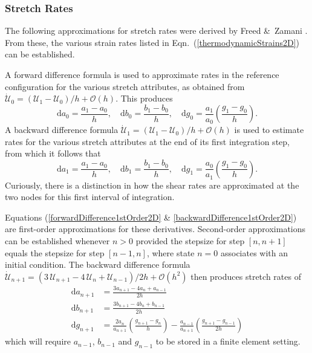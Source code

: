 \subsubsection{Stretch Rates}

The following approximations for stretch rates were derived by Freed \&\ Zamani \cite{FreedZamani18}.  From these, the various strain rates listed in Eqn.~(\ref{thermodynamicStrains2D}) can be established.  

A forward difference formula is used to approximate rates in the reference configuration for the various stretch attributes, as obtained from $\dot{\boldsymbol{\mathcal{U}}}_0 = ( \boldsymbol{\mathcal{U}}_1 -  \boldsymbol{\mathcal{U}}_0 ) / h + \mathcal{O}(h)$.  This produces
\begin{equation}
\mathrm{d} a_0 = \frac {a_1 - a_0}{h} , \quad 
\mathrm{d} b_0 = \frac {b_1 - b_0}{h} , \quad 
\mathrm{d} g_0 = \frac{a_1}{a_0} 
\left( \frac{g_1 - g_0}{h} \right) .
\label{forwardDifference1stOrder2D}
\end{equation}
A backward difference formula $\dot{\boldsymbol{\mathcal{U}}}_1 = ( \boldsymbol{\mathcal{U}}_1 - \boldsymbol{\mathcal{U}}_0 ) / h + \mathcal{O}(h)$ is used to estimate rates for the various stretch attributes at the end of its first integration step, from which it follows that
\begin{equation}
\mathrm{d} a_1 = \frac {a_1 - a_0}{h} , \quad
\mathrm{d} b_1 = \frac {b_1 - b_0}{h} , \quad
\mathrm{d} g_1 = \frac{a_0}{a_1} 
\left(\frac{g_1 - g_0}{h} \right) .
\label{backwardDifference1stOrder2D}
\end{equation}
Curiously, there is a distinction in how the shear rates are approximated at the two nodes for this first interval of integration.

Equations (\ref{forwardDifference1stOrder2D} \& \ref{backwardDifference1stOrder2D}) are first-order approximations for these derivatives.  Second-order approximations can be established whenever $n > 0$ provided the stepsize for step $[n, n+1]$ equals the stepsize for step $[n-1, n]$, where state $n=0$ associates with an initial condition.  The backward difference formula  $\dot{\boldsymbol{\mathcal{U}}}_{n+1} = ( 3 \, \boldsymbol{\mathcal{U}}_{n+1} -  4 \, \boldsymbol{\mathcal{U}}_{n} + \boldsymbol{\mathcal{U}}_{n-1} ) / 2h + \mathcal{O}(h^2)$ then produces stretch rates of
\begin{equation}
\begin{aligned}
\mathrm{d} a_{n+1} & 
= \frac {3a_{n+1} - 4a_{n} +  a_{n-1}}{2h} \\ 
\mathrm{d} b_{n+1} & 
= \frac {3b_{n+1} - 4b_{n} +  b_{n-1}}{2h} \\
\mathrm{d} g_{n+1} & 
= \frac{2a_{n}} {a_{n+1}} \left(\frac{g_{n+1} - g_{n}}{h} \right) - \frac{a_{n-1}}{a_{n+1}} \left( \frac{g_{n+1} - g_{n-1}}{2h} \right) 
\end{aligned}
\label{backwardDifference2ndOrder2D}
\end{equation}
which will require $a_{n-1}$, $b_{n-1}$ and $g_{n-1}$ to be stored in a finite element setting.

